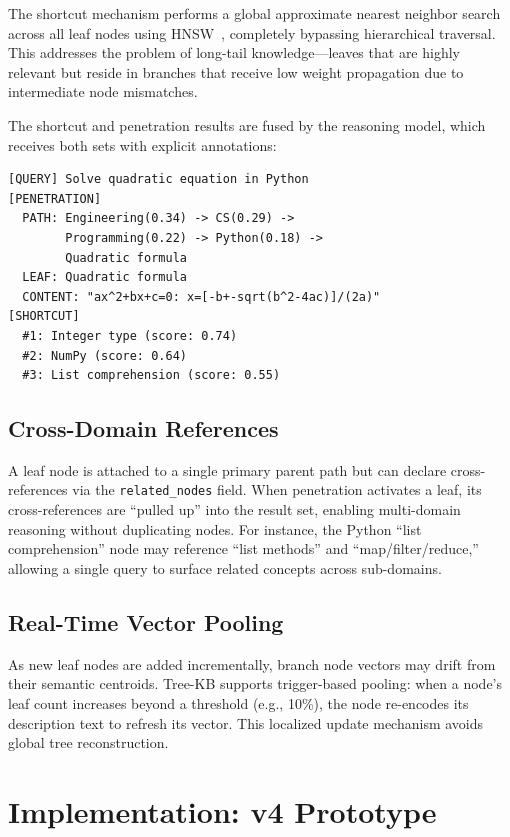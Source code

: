 \documentclass[11pt,a4paper]{article}
\begin{document}
The shortcut mechanism performs a global approximate nearest neighbor search across all leaf nodes using HNSW~\cite{malkov2018efficient}, completely bypassing hierarchical traversal. This addresses the problem of long-tail knowledge---leaves that are highly relevant but reside in branches that receive low weight propagation due to intermediate node mismatches.

The shortcut and penetration results are fused by the reasoning model, which receives both sets with explicit annotations:

\begin{lstlisting}[caption=Input format for the reasoning model, label=lst:input]
[QUERY] Solve quadratic equation in Python
[PENETRATION]
  PATH: Engineering(0.34) -> CS(0.29) ->
        Programming(0.22) -> Python(0.18) ->
        Quadratic formula
  LEAF: Quadratic formula
  CONTENT: "ax^2+bx+c=0: x=[-b+-sqrt(b^2-4ac)]/(2a)"
[SHORTCUT]
  #1: Integer type (score: 0.74)
  #2: NumPy (score: 0.64)
  #3: List comprehension (score: 0.55)
\end{lstlisting}

\subsection{Cross-Domain References}

A leaf node is attached to a single primary parent path but can declare cross-references via the \texttt{related\_nodes} field. When penetration activates a leaf, its cross-references are ``pulled up'' into the result set, enabling multi-domain reasoning without duplicating nodes. For instance, the Python ``list comprehension'' node may reference ``list methods'' and ``map/filter/reduce,'' allowing a single query to surface related concepts across sub-domains.

\subsection{Real-Time Vector Pooling}

As new leaf nodes are added incrementally, branch node vectors may drift from their semantic centroids. Tree-KB supports trigger-based pooling: when a node's leaf count increases beyond a threshold (e.g., 10\%), the node re-encodes its description text to refresh its vector. This localized update mechanism avoids global tree reconstruction.

\section{Implementation: v4 Prototype}
\label{sec:implementation}
\end{document}
